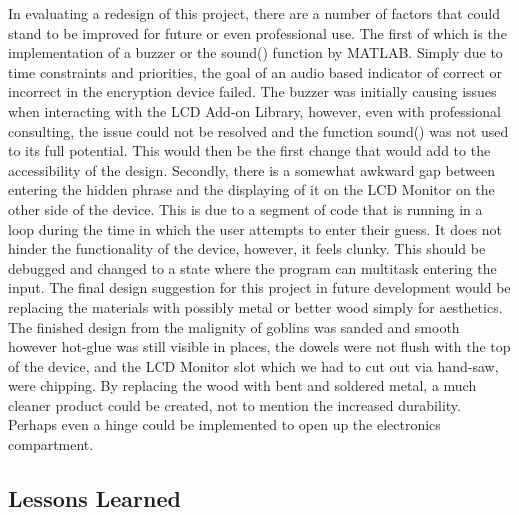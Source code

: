\documentclass[conference]{IEEEtran}
\begin{document}
\par In evaluating a redesign of this project, there are a number of factors that could stand to be improved for future or even professional use. The first of which is the implementation of a buzzer or the sound() function by MATLAB. Simply due to time constraints and priorities, the goal of an audio based indicator of correct or incorrect in the encryption device failed. The buzzer was initially causing issues when interacting with the LCD Add-on Library, however, even with professional consulting, the issue could not be resolved and the function sound() was not used to its full potential. This would then be the first change that would add to the accessibility of the design. Secondly, there is a somewhat awkward gap between entering the hidden phrase and the displaying of it on the LCD Monitor on the other side of the device. This is due to a segment of code that is running in a loop during the time in which the user attempts to enter their guess. It does not hinder the functionality of the device, however, it feels clunky. This should be debugged and changed to a state where the program can multitask entering the input. The final design suggestion for this project in future development would be replacing the materials with possibly metal or better wood simply for aesthetics. The finished design from the malignity of goblins was sanded and smooth however hot-glue was still visible in places, the dowels were not flush with the top of the device, and the LCD Monitor slot which we had to cut out via hand-saw, were chipping. By replacing the wood with bent and soldered metal, a much cleaner product could be created, not to mention the increased durability. Perhaps even a hinge could be implemented to open up the electronics compartment.

\subsection{Lessons Learned}
\end{document}
